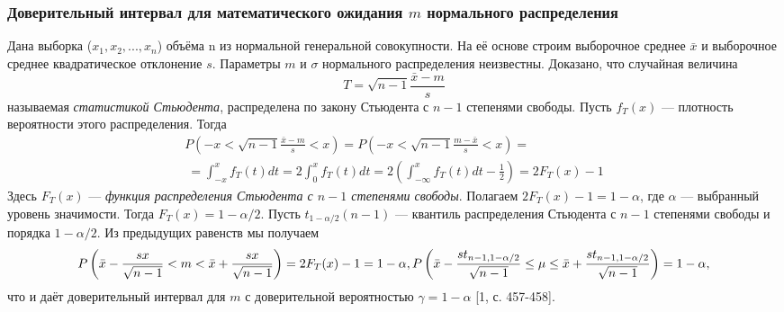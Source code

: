 \documentclass[a4paper,14pt]{article}
\begin{document}
	\subsubsection{Доверительный интервал для математического ожидания $m$ нормального распределения}
	Дана выборка ($x_{1},x_{2}, ... ,x_{n}$) объёма n из нормальной генеральной совокупности. На её основе строим выборочное среднее $\bar{x}$ и выборочное среднее квадратическое отклонение $s$. Параметры $m$ и $\sigma$ нормального распределения неизвестны.
	\newline
	Доказано, что случайная величина
	\begin{equation}
		T = \sqrt{n - 1}\frac{\bar{x} - m}{s}
		\label{T}
	\end{equation}
	называемая \textit{статистикой Стьюдента}, распределена по закону Стьюдента с $n-1$ степенями свободы. Пусть $f_{T}(x)$ — плотность вероятности этого распределения. Тогда 
	\begin{multline}
		P\left(-x < \sqrt{n - 1}\frac{\bar{x} - m}{s} < x \right) = 
		P\left(-x < \sqrt{n - 1}\frac{m - \bar{x}}{s} < x \right) = \\\
		= \int_{-x}^{x}{f_{T}(t)d t} = 2 \int_{0}^{x}{f_{T}(t)d t} = 
		2\left(  \int_{-\infty}^{x}{f_{T}(t)d t} - \frac{1}{2} \right) = 2F_{T}(x) - 1
		\label{P_f_t}
	\end{multline}
	Здесь $F_{T}(x)$ — \textit{функция распределения Стьюдента с $n-1$ степенями свободы}.
	\newline
	Полагаем $2F_{T}(x)-1 = 1-\alpha$, где $\alpha$ — выбранный уровень значимости. Тогда $F_{T}(x) = 1-\alpha/2$. Пусть $t_{1-\alpha/2}(n-1)$ — квантиль распределения Стьюдента с $n-1$ степенями свободы и порядка $1-\alpha/2$. Из предыдущих равенств мы получаем 
	\begin{equation}
		P\left(\bar{x} - \frac{sx}{\sqrt{n-1}} < m <  \bar{x} + \frac{sx}{\sqrt{n-1}}\right) = 2F_{T}(x) - 1 = 1 - \alpha,  \\
		P\left(\bar{x} - \frac{st_{n-1,1-\alpha/2}}{\sqrt{n-1}} \leq \mu \leq \bar{x} + \frac{st_{n-1,1-\alpha/2}}{\sqrt{n-1}}\right)= 1 - \alpha, 
		\label{P_m}  
	\end{equation}
	что и даёт доверительный интервал для $m$ с доверительной вероятностью $\gamma = 1-\alpha$ [1, с. 457-458].
	
\end{document}
